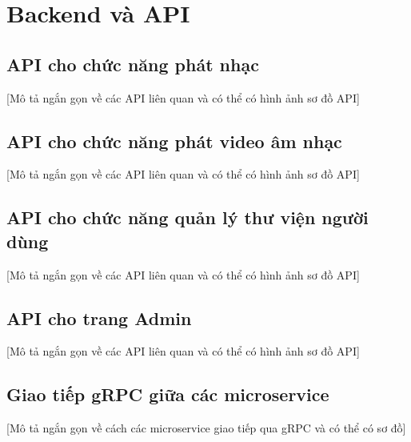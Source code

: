 \section{Backend và API}
\label{sec:backend_implementation}

\subsection{API cho chức năng phát nhạc}
\label{subsec:music_api}
[Mô tả ngắn gọn về các API liên quan và có thể có hình ảnh sơ đồ API]

\subsection{API cho chức năng phát video âm nhạc}
\label{subsec:video_api}
[Mô tả ngắn gọn về các API liên quan và có thể có hình ảnh sơ đồ API]

\subsection{API cho chức năng quản lý thư viện người dùng}
\label{subsec:library_api}
[Mô tả ngắn gọn về các API liên quan và có thể có hình ảnh sơ đồ API]

\subsection{API cho trang Admin}
\label{subsec:admin_api}
[Mô tả ngắn gọn về các API liên quan và có thể có hình ảnh sơ đồ API]

\subsection{Giao tiếp gRPC giữa các microservice}
\label{subsec:grpc_communication}
[Mô tả ngắn gọn về cách các microservice giao tiếp qua gRPC và có thể có sơ đồ]